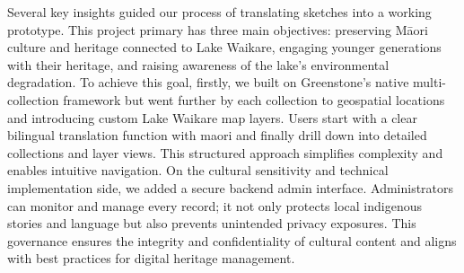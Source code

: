 ﻿%


Several key insights guided our process of translating sketches into a working prototype.
This project primary has three main objectives: preserving Māori culture and heritage connected to Lake Waikare, engaging younger generations with their heritage, and raising awareness of the lake’s environmental degradation.
To achieve this goal, firstly, we built on Greenstone’s native multi-collection framework but went further by each collection to geospatial locations and introducing custom Lake Waikare map layers.
Users start with a clear bilingual translation function with maori and finally drill down into detailed collections and layer views.
This structured approach simplifies complexity and enables intuitive navigation.
On the cultural sensitivity and technical implementation side, we added a secure backend admin interface. Administrators can monitor and manage every record; it not only protects local indigenous stories and language but also prevents unintended privacy exposures. This governance ensures the integrity and confidentiality of cultural content and aligns with best practices for digital heritage management.


